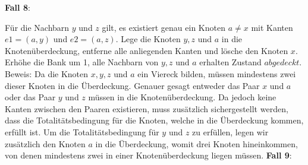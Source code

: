 \documentclass[12pt,onecolumn, notitlepage]{scrartcl}
\begin{document}
\textbf{Fall 8}:\newline
\begin{center}
\end{center}
Für die Nachbarn $y$ und $z$ gilt, es existiert genau ein Knoten $a \neq x$ mit Kanten $e1 = (a,y)$ und $e2 = (a,z)$. Lege die Knoten $y,z$ und $a$ in die Knotenüberdeckung, entferne alle anliegenden Kanten und lösche den Knoten $x$. Erhöhe die Bank um 1, alle Nachbarn von $y,z$ und $a$ erhalten Zustand $abgedeckt$.   \newline
Beweis: Da die Knoten $x,y,z$ und $a$ ein Viereck bilden, müssen mindestens zwei dieser Knoten in die Überdeckung. Genauer gesagt entweder das Paar $x$ und $a$ oder das Paar $y$ und $z$ müssen in die Knotenüberdeckung. Da jedoch keine Kanten zwischen den Paaren existieren, muss zusätzlich sichergestellt werden, dass die Totalitätsbedingung für die Knoten, welche in die Überdeckung kommen, erfüllt ist. Um die Totalitätsbedingung für $y$ und $z$ zu erfüllen, legen wir zusätzlich den Knoten $a$ in die Überdeckung, womit drei Knoten hineinkommen, von denen mindestens zwei in einer Knotenüberdeckung liegen müssen. \newline\newline
\textbf{Fall 9}:\newline
\begin{center}
\end{center}
\end{document}
